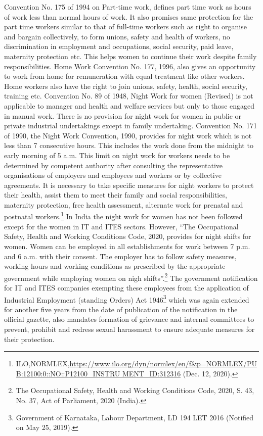 \begin{multicols}{2}
\noi
Convention No. 175 of 1994 on Part-time work, defines part time work as hours of work less
than normal hours of work. It also promises same protection for the part time workers similar
to that of full-time workers such as right to organise and bargain collectively, to form unions,
safety and health of workers, no discrimination in employment and occupations, social
security, paid leave, maternity protection etc. This helps women to continue their work
despite family responsibilities. Home Work Convention No. 177, 1996, also gives an
opportunity to work from home for remuneration with equal treatment like other workers.
Home workers also have the right to join unions, safety, health, social security, training etc.
Convention No. 89 of 1948, Night Work for women (Revised) is not applicable to manager
and health and welfare services but only to those engaged in manual work. There is no
provision for night work for women in public or private industrial undertakings except in
family undertaking. Convention No. 171 of 1990, the Night Work Convention, 1990,
provides for night work which is not less than 7 consecutive hours. This includes the work
done from the midnight to early morning of 5 a.m. This limit on night work for workers
needs to be determined by competent authority after consulting the representative 
organisations of employers and employees and workers or by collective agreements. It is
necessary to take specific measures for night workers to protect their health, assist them to
meet their family and social responsibilities, maternity protection, free health assessment,
alternate work for prenatal and postnatal workers.\footnote{ILO,NORMLEX,\url{https://www.ilo.org/dyn/normlex/en/f\&p=NORMLEX/PUB:12100:0::NO::P12100_INSTRU
MENT_ID:312316} (Dec. 12, 2020).}  In India the night work for women has
not been followed except for the women in IT and ITES sectors. However, “The
Occupational Safety, Health and Working Conditions Code, 2020, provides for night shifts
for women. Women can be employed in all establishments for work between 7 p.m. and 6
a.m. with their consent. The employer has to follow safety measures, working hours and
working conditions as prescribed by the appropriate government while employing women on
nigh shifts”.\footnote{The Occupational Safety, Health and Working Conditions Code, 2020, S. 43, No. 37, Act of Parliament, 2020 (India).} The government notification for IT and ITES companies exempting these
employees from the application of Industrial Employment (standing Orders) Act 1946\footnote{Government of Karnataka, Labour Department, LD 194 LET 2016 (Notified on May 25, 2019).}
which was again extended for another five years from the date of publication of the
notification in the official gazette, also mandates formation of grievance and internal
committees to prevent, prohibit and redress sexual harassment to ensure adequate measures
for their protection. 


\end{multicols}
